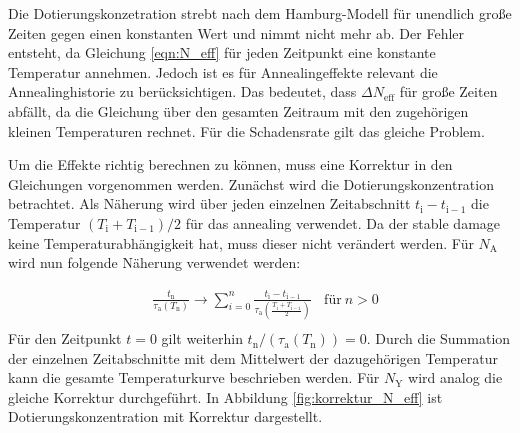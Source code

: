 
Die Dotierungskonzetration strebt nach dem Hamburg-Modell
für unendlich große Zeiten gegen einen konstanten Wert und nimmt nicht mehr
ab.
Der Fehler entsteht, da Gleichung \ref{eqn:N_eff} für jeden
Zeitpunkt eine konstante Temperatur annehmen. Jedoch ist es für Annealingeffekte
relevant die Annealinghistorie zu berücksichtigen.
Das bedeutet, dass $\Delta N_{\mathrm{eff}}$ für große Zeiten abfällt, da die Gleichung über den
gesamten Zeitraum mit den zugehörigen kleinen Temperaturen rechnet. Für
die Schadensrate gilt das gleiche Problem.

Um die Effekte richtig berechnen zu können, muss eine Korrektur in den
Gleichungen vorgenommen werden.
Zunächst wird die Dotierungskonzentration betrachtet. Als Näherung wird über
jeden einzelnen Zeitabschnitt $t_{\mathrm{i}} - t_{\mathrm{i-1}}$ die
Temperatur $(T_{\mathrm{i}} +T_{\mathrm{i-1}})/2$ für das annealing verwendet.
Da der stable damage keine Temperaturabhängigkeit hat, muss dieser nicht
verändert werden. Für $N_{\mathrm{A}}$ wird nun folgende Näherung
verwendet werden:

\begin{align}
  &\frac{t_{\mathrm{n}}}{\tau_{\mathrm{a}}(T_{\mathrm{n}})} \rightarrow \sum_{i=0}^n  \frac{t_{\mathrm{i}} - t_{\mathrm{i-1}}}{\tau_{\mathrm{a}}(\frac{T_{\mathrm{i}} +T_{\mathrm{i-1}}}{2})} \:\:\:\: \text{für} \: n>0 \\
\end{align}
Für den Zeitpunkt $t=0$ gilt weiterhin $t_{\mathrm{n}}/(\tau_{\mathrm{a}}(T_{\mathrm{n}})) = 0$.
Durch die Summation der einzelnen Zeitabschnitte mit dem Mittelwert der dazugehörigen
Temperatur kann die gesamte Temperaturkurve beschrieben werden. Für $N_{\mathrm{Y}}$
wird analog die gleiche Korrektur durchgeführt.
In Abbildung \ref{fig:korrektur_N_eff} ist Dotierungskonzentration mit Korrektur dargestellt.


